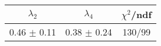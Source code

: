 \begin{tabular}{c|c||c}
$\lambda_{2}$ & $\lambda_4$ & $\chi^{2}$/ndf \\
\hline
0.46 $\pm$ 0.11 & 0.38 $\pm$ 0.24 & 130/99\\
\end{tabular}
